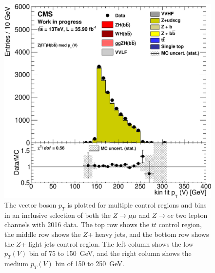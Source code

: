 \begin{figure}
  \includegraphics[width=0.42\linewidth]{figures/2016_Zll/Zlf_med_Zll__kinFit_V_pt_.pdf}
  \caption[Control region plots for two leptons in 2016]{
    The vector boson $p_T$ is plotted for multiple control regions and bins in
    an inclusive selection of both the $Z\rightarrow \mu\mu$ and $Z\rightarrow ee$
    two lepton channels with 2016 data.
    The top row shows the $t\bar{t}$ control region,
    the middle row shows the $Z$+ heavy jets,
    and the bottom row shows the $Z$+ light jets control region.
    The left column shows the low $p_T(V)$ bin of 75 to \SI{150}{GeV},
    and the right column shows the medium $p_T(V)$ bin of 150 to \SI{250}{GeV}.
  }
  \label{fig:2016_Zll_vpt}
\end{figure}

